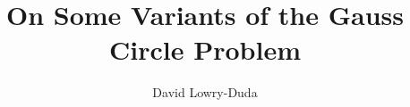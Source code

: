 \documentclass[12pt]{report}   %
\title{On Some Variants of the Gauss Circle Problem}
\author{David Lowry-Duda}
\theoremstyle{definition}
\begin{document}


\begin{preliminaries}
\maketitle

\copyrightpage


\begin{abstract}
  \thispagestyle{empty}
  
  \thispagestyle{empty}
\end{abstract}


\begin{signature}
\end{signature}


\begin{vita}
  
\end{vita}


\begin{dedication}
  
\end{dedication}


\begin{acknowledgments}
  
\end{acknowledgments}


\begin{spacing}{1}
  \tableofcontents
  \clearpage{\pagestyle{empty}\cleardoublepage}

  \footnotesize
  \fontsize{11.5pt}{12.5pt}\selectfont

  \normalsize
\end{spacing}

\end{preliminaries}



\pagestyle{myheadings}




%
\end{document}
